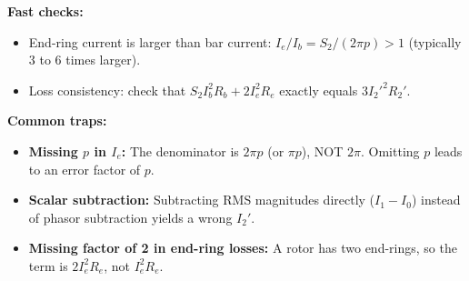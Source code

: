 \textbf{Fast checks:}
\begin{itemize}
  \item End-ring current is larger than bar current: \(I_e / I_b = S_2 / (2\pi p) > 1\) (typically 3 to 6 times larger).
  \item Loss consistency: check that \(S_2 I_b^2 R_b + 2 I_e^2 R_e\) exactly equals \(3 {I_2'}^2 R_2'\).
\end{itemize}

\textbf{Common traps:}
\begin{itemize}
  \item \textbf{Missing \(p\) in \(I_e\):} The denominator is \(2\pi p\) (or \(\pi p\)), NOT \(2\pi\). Omitting \(p\) leads to an error factor of \(p\).
  \item \textbf{Scalar subtraction:} Subtracting RMS magnitudes directly (\(I_1 - I_0\)) instead of phasor subtraction yields a wrong \(I_2'\).
  \item \textbf{Missing factor of 2 in end-ring losses:} A rotor has two end-rings, so the term is \(2 I_e^2 R_e\), not \(I_e^2 R_e\).
\end{itemize}
